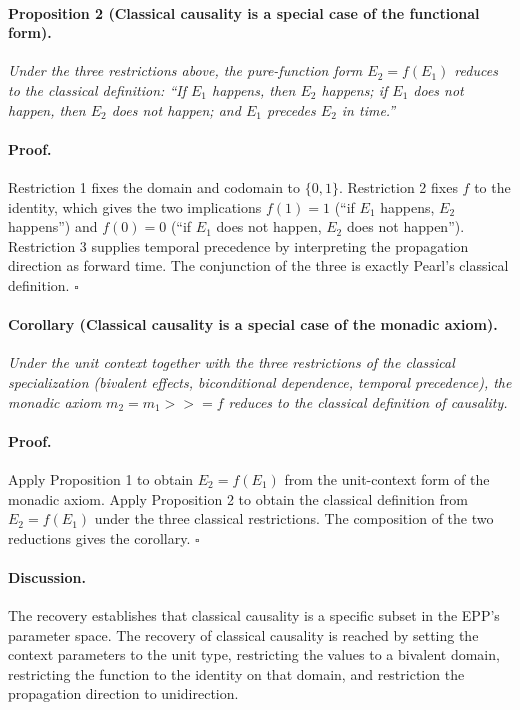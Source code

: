 \newpage

 
\paragraph{Proposition 2 (Classical causality is a special case of the functional form).}
\emph{Under the three restrictions above, the pure-function form $E_2 = f(E_1)$ reduces to the classical definition: ``If $E_1$ happens, then $E_2$ happens; if $E_1$ does not happen, then $E_2$ does not happen; and $E_1$ precedes $E_2$ in time.''}

 
\paragraph{Proof.}
Restriction 1 fixes the domain and codomain to $\{0, 1\}$. Restriction 2 fixes $f$ to the identity, which gives the two implications $f(1) = 1$ (``if $E_1$ happens, $E_2$ happens'') and $f(0) = 0$ (``if $E_1$ does not happen, $E_2$ does not happen''). Restriction 3 supplies temporal precedence by interpreting the propagation direction as forward time. The conjunction of the three is exactly Pearl's classical definition. $\square$
 
\paragraph{Corollary (Classical causality is a special case of the monadic axiom).}
\emph{Under the unit context together with the three restrictions of the classical specialization (bivalent effects, biconditional dependence, temporal precedence), the monadic axiom $m_2 = m_1 \mathbin{>\!\!>\!\!=} f$ reduces to the classical definition of causality.}
 
\paragraph{Proof.}
Apply Proposition 1 to obtain $E_2 = f(E_1)$ from the unit-context form of the monadic axiom. Apply Proposition 2 to obtain the classical definition from $E_2 = f(E_1)$ under the three classical restrictions. The composition of the two reductions gives the corollary. $\square$

\paragraph{Discussion.}
The recovery establishes that classical causality is a specific subset in the EPP's parameter space. The recovery of classical causality is reached by setting the context parameters to the unit type, restricting the values to a bivalent domain, restricting the function to the identity on that domain, and restriction the propagation direction to unidirection. 

